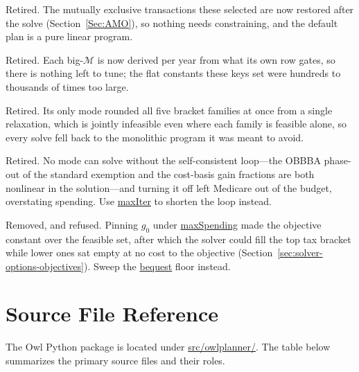 \documentclass[fleqn,12pt]{report}
\newcommand{\code}[1]{\url{#1}}
\begin{document}
\begin{description}[style=nextline, leftmargin=1.5cm, font=\ttfamily]
\item[amoConstraints, amoRoth, amoSurplus]
Retired.  The mutually exclusive transactions these selected are now restored
after the solve (Section~\ref{Sec:AMO}), so nothing needs constraining, and the
default plan is a pure linear program.
\item[bigMamo, bigMaca, bigMss, bigMltcg, bigMniit]
Retired.  Each big-$\mathcal{M}$ is now derived per year from what its own row
gates, so there is nothing left to tune; the flat constants these keys set were
hundreds to thousands of times too large.
\item[withDecomposition]
Retired.  Its only mode rounded all five bracket families at once from a single
relaxation, which is jointly infeasible even where each family is feasible
alone, so every solve fell back to the monolithic program it was meant to avoid.
\item[withSCLoop]
Retired.  No mode can solve without the self-consistent loop---the OBBBA
phase-out of the standard exemption and the cost-basis gain fractions are both
nonlinear in the solution---and turning it off left Medicare out of the budget,
overstating spending.  Use \code{maxIter} to shorten the loop instead.
\item[fixedSpending]
Removed, and refused.  Pinning $g_0$ under \code{maxSpending} made the objective
constant over the feasible set, after which the solver could fill the top tax
bracket while lower ones sat empty at no cost to the objective
(Section~\ref{sec:solver-options-objectives}).  Sweep the \code{bequest} floor
instead.
\end{description}

\chapter{Source File Reference}
\label{Chap:SourceRef}

The Owl Python package is located under \code{src/owlplanner/}.
The table below summarizes the primary source files and their roles.
\end{document}
